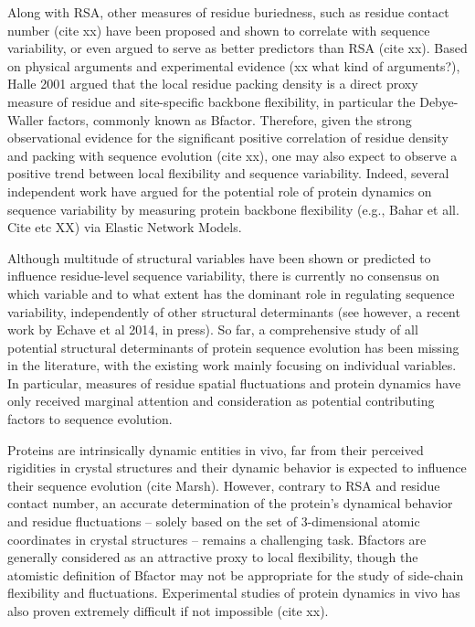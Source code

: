 \documentclass[preprint,12pt]{article}
\begin{document}
    Along with RSA, other measures of residue buriedness, such as residue contact number (cite xx) have been proposed and shown to correlate with sequence variability, or even argued to serve as better predictors than RSA (cite xx).  Based on physical arguments and experimental evidence (xx what kind of arguments?), Halle 2001 argued that the local residue packing density is a direct proxy measure of residue and site-specific backbone flexibility, in particular the Debye-Waller factors, commonly known as Bfactor. Therefore, given the strong observational evidence for the significant positive correlation of residue density and packing with sequence evolution (cite xx), one may also expect to observe a positive trend between local flexibility and sequence variability. Indeed, several independent work have argued for the potential role of protein dynamics on sequence variability by measuring protein backbone flexibility (e.g., Bahar et all. Cite etc XX) via Elastic Network Models.
	
    Although multitude of structural variables have been shown or predicted to influence residue-level sequence variability, there is currently no consensus on which variable and to what extent has the dominant role in regulating sequence variability, independently of other structural determinants (see however, a recent work by Echave et al 2014, in press). So far, a comprehensive study of all potential structural determinants of protein sequence evolution has been missing in the literature, with the existing work mainly focusing on individual variables. In particular, measures of residue spatial fluctuations and protein dynamics have only received marginal attention and consideration as potential contributing factors to sequence evolution.

    Proteins are intrinsically dynamic entities in vivo, far from their perceived rigidities in crystal structures and their dynamic behavior is expected to influence their sequence evolution (cite Marsh).  However, contrary to RSA and residue contact number, an accurate determination of the protein's dynamical behavior and residue fluctuations -- solely based on the set of 3-dimensional atomic coordinates in crystal structures -- remains a challenging task. Bfactors are generally considered as an attractive proxy to local flexibility, though the atomistic definition of Bfactor may not be appropriate for the study of side-chain flexibility and fluctuations. Experimental studies of protein dynamics in vivo has also proven extremely difficult if not impossible (cite xx).
\end{document}
